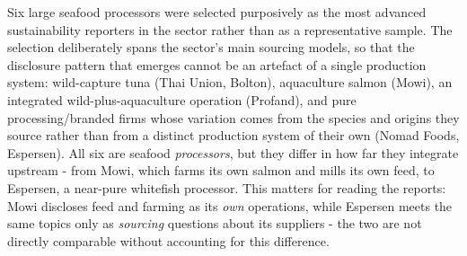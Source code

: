 Six large seafood processors were selected purposively as the most
advanced sustainability reporters in the sector rather than as a
representative sample. The selection deliberately spans the sector's main
sourcing models, so that the disclosure pattern that emerges cannot be an
artefact of a single production system: wild-capture tuna (Thai Union,
Bolton), aquaculture salmon (Mowi), an integrated wild-plus-aquaculture
operation (Profand), and pure processing/branded firms whose variation comes
from the species and origins they source rather than from a distinct
production system of their own (Nomad Foods, Espersen).
All six are seafood \emph{processors}, but they differ in how far they integrate
upstream - from Mowi, which farms its own salmon and mills its own feed, to
Espersen, a near-pure whitefish processor. This matters for reading the
reports: Mowi discloses feed and farming as its \emph{own} operations,
while Espersen meets the same topics only as \emph{sourcing} questions about
its suppliers - the two are not directly comparable without accounting for
this difference.


